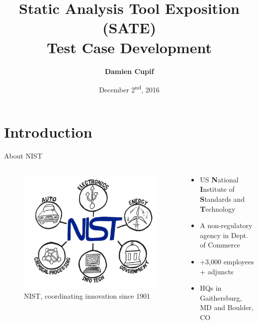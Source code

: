 \documentclass[aspectratio=169]{beamer}
\title{Static Analysis Tool Exposition (SATE)\\Test Case Development}
\date{December 2\textsuperscript{nd}, 2016}
\author{\textbf{Damien Cupif}}
\institute{\textbf{\textit{Oral Defense for TELECOM Nancy Master's Degree}}}
\begin{document}
  \maketitle

  \section*{Introduction}
  
  \begin{frame}{About NIST}
    \begin{columns}[t]
      \begin{column}{0.29\textwidth}
        \begin{figure}
          \centering
          \includegraphics[scale=0.14]{figures/nist-central-role}
          \caption{NIST, coordinating innovation since 1901}
        \end{figure}
      \end{column}
      \begin{column}{0.71\textwidth}
        \begin{small}
        \begin{itemize}
        \item US \textbf{N}ational \textbf{I}nstitute of \textbf{S}tandards and \textbf{T}echnology
        \item A non-regulatory agency in Dept. of Commerce
        \item \alert{+3,000} employees + adjuncts
        \item HQs in Gaithersburg, MD and Boulder, CO

\end{itemize}
\end{small}
\end{column}
\end{columns}
\end{frame}
\end{document}
